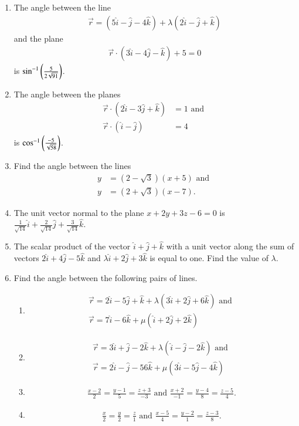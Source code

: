 \begin{enumerate}[label=\thesubsection.\arabic*,ref=\thesubsection.\theenumi]
\item The angle between the line 
\begin{align}
	\overrightarrow{r}=(5\hat{i}-\hat{j}-4\hat{k})+\lambda(2\hat{i}-\hat{j}+\hat{k})
\end{align}
	and the plane 
\begin{align}
	\overrightarrow{r} \cdot (3\hat{i}-4\hat{j}-\hat{k})+5=0
\end{align}
	is $\sin^{-1}\left(\frac{5}{2\sqrt{91}}\right)$.
\item The angle between the planes 
\begin{align}
	\overrightarrow{r} \cdot (2\hat{i}-3\hat{j}+\hat{k})&=1 
	\text{ and }
	\\
	\overrightarrow{r} \cdot (\hat{i}-\hat{j})&=4  
\end{align}
is
	$\cos^{-1} \left(\frac{-5}{\sqrt{58}}\right)$.
\item Find the angle between the lines 
\begin{align}
	y&=(2-\sqrt{3})(x+5)\text{ and }
	\\
	y&=(2+\sqrt{3})(x-7).
\end{align}
\item The unit vector normal to the plane $x+2y+3z-6=0$ is $\frac{1}{\sqrt{14}}\hat{i} + \frac{2}{\sqrt{14}}\hat{j} + \frac{3}{\sqrt{14}}\hat{k}$.
\item The scalar product of the vector $\hat{i}+\hat{j}+\hat{k}$ with a unit vector along the sum of vectors $2\hat{i}+4\hat{j}-5\hat{k}$ and $\lambda\hat{i}+2\hat{j}+3\hat{k}$ is equal to one. Find the value of $\lambda$.
\item  Find the angle between the following pairs of lines.
\begin{enumerate}	
\item  
\begin{align}
\overrightarrow{r}=2\hat{i}-5\hat{j}+\hat{k}+\lambda(3\hat{i}+2\hat{j}+6\hat{k}) \text{ and }\\ \overrightarrow{r}=7\hat{i}-6\hat{k}+\mu(\hat{i}+2\hat{j}+2\hat{k}) 
\end{align} 
\item 
\begin{align}
\overrightarrow{r}=3\hat{i}+\hat{j}-2\hat{k}+\lambda(\hat{i}-\hat{j}-2\hat{k}) \text{ and }\\ \overrightarrow{r}=2\hat{i}-\hat{j}-56\hat{k}+\mu(3\hat{i}-5\hat{j}-4\hat{k})
\end{align}
\item 
\begin{align} \frac{x-2}{2}=\frac{y-1}{5}=\frac{z+3}{-3}\text{ and } \frac{x+2}{-1}=\frac{y-4}{8}=\frac{z-5}{4}.
\end{align}
\item
\begin{align} \frac{x}{2}=\frac{y}{2}=\frac{z}{1}\text{ and } \frac{x-5}{4}=\frac{y-2}{1}=\frac{z-3}{8}.
\end{align}
\end{enumerate}
\end{enumerate}
